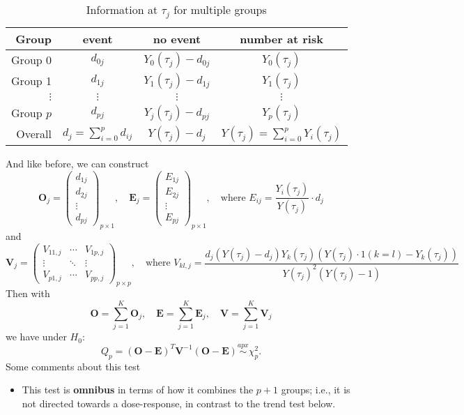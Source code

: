 \documentclass[a4paper,12pt]{article}
\begin{document}
\begin{table}[htbp]
  \centering
  \begin{tabular}{|r|c|c|c|}
    \hline
    Group & event & no event & number at risk    \\
    \hline
    Group 0 & $d_{0j}$ & $Y_0\left(\tau_j\right) - d_{0j}$ & $Y_0\left(\tau_j\right)$    \\
    \hline
    Group 1 & $d_{1j}$ & $Y_1\left(\tau_j\right) - d_{1j}$ & $Y_1\left(\tau_j\right)$    \\
    \hline
    $\vdots$ & $\vdots$ & $\vdots$ & $\vdots$     \\
    \hline
    Group $p$ & $d_{pj}$ & $Y_j\left(\tau_j\right) - d_{pj}$ & $Y_p\left(\tau_j\right)$    \\
    \hline
    Overall & $d_j = \sum\limits_{i = 0}^pd_{ij}$
                  & $Y\left(\tau_j\right) - d_{j}$
                             & $Y\left(\tau_j\right) = \sum\limits_{i = 0}^pY_i\left(\tau_j\right)$    \\
    \hline
  \end{tabular}
  \caption{Information at $\tau_j$ for multiple groups}
  \label{tab:multiple_groups_contingency_table_at_tau_j}
\end{table}
And like before, we can construct
\[
  \bm{O}_j =
  \begin{pmatrix}
    d_{1j}    \\
    d_{2j}    \\
    \vdots    \\
    d_{pj}
  \end{pmatrix}_{p\times 1}
  ,\quad
  \bm{E}_j =
  \begin{pmatrix}
    E_{1j}    \\
    E_{2j}    \\
    \vdots    \\
    E_{pj}
  \end{pmatrix}_{p\times 1}
  ,\quad\text{where }
  E_{ij} = \frac{Y_i\left(\tau_j\right)}{Y\left(\tau_j\right)}\cdot d_j
\]
and
\[
  \bm{V}_j =
  \begin{pmatrix}
    V_{11,j} & \cdots & V_{1p,j}    \\
    \vdots & \ddots & \vdots    \\
    V_{p1,j} & \cdots & V_{pp,j}
  \end{pmatrix}_{p\times p}
  ,\quad\text{where }
  V_{kl,j} = \frac{
    d_j\left(Y\left(\tau_j\right) - d_j\right)Y_k\left(\tau_j\right)
    \left(
      Y\left(\tau_j\right) \cdot 1\left(k = l\right)
      - Y_k\left(\tau_j\right)
    \right)
  }{
    Y\left(\tau_j\right)^2\left(Y\left(\tau_j\right) - 1\right)
  }
\]
Then with
\[
  \bm{O} = \sum\limits_{j = 1}^K\bm{O}_j
  ,\quad
  \bm{E} = \sum\limits_{j = 1}^K\bm{E}_j
  ,\quad
  \bm{V} = \sum\limits_{j = 1}^K\bm{V}_j
\]
we have under $H_0$:
\[
  Q_p  = \left(
    \bm{O} - \bm{E}
  \right)^T
  \bm{V}^{-1}
  \left(\bm{O} - \bm{E}\right)
  \overset{apx}{\sim}
  \chi^2_p
  .
\]
Some comments about this test
\begin{itemize}
\item This test is \textbf{omnibus} in terms of how it combines the $p+1$ groups; i.e., it is not directed towards a dose-response, in contrast to the trend test below.
\end{itemize}
\end{document}
